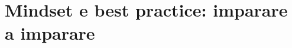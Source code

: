 %
%
%    
%    
%

\chapter[Mindset e best practice]{Mindset e best practice: imparare a
imparare}
\label{p0:cap:mindset}

